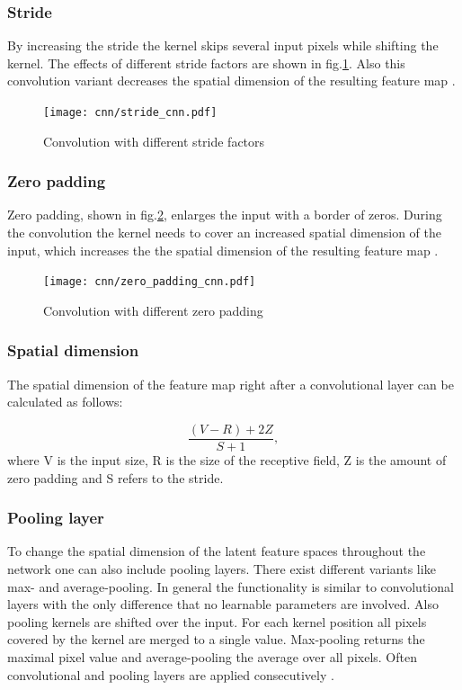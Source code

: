 \subsubsection{Stride}
By increasing the stride the kernel skips several input pixels while shifting the kernel. The effects of different stride factors are shown in fig.\ref{fig:stride_cnn}. Also this convolution variant decreases the spatial dimension of the resulting feature map \cite{OShea2015}.

\begin{figure}[H]
  \centering
  \texttt{[image: cnn/stride\_cnn.pdf]}
  \caption {Convolution with different stride factors}
  \label{fig:stride_cnn}
\end{figure}


\subsubsection{Zero padding}
Zero padding, shown in fig.\ref{fig:zero_padding_cnn}, enlarges the input with a border of zeros. During the convolution the kernel needs to cover an increased spatial dimension of the input, which increases the the spatial dimension of the resulting feature map \cite{OShea2015}.

\begin{figure}[H]
  \centering
  \texttt{[image: cnn/zero\_padding\_cnn.pdf]}
  \caption {Convolution with different zero padding}
  \label{fig:zero_padding_cnn}
\end{figure}



\subsubsection{Spatial dimension}

 The spatial dimension of the feature map right after a convolutional layer can be calculated as follows:

\begin{equation}
  \frac{(V-R)+2Z}{S+1}, 
  \label{eq:spatial_dimensionality_cnn_feature map}
\end{equation}
where V is the input size, R is the size of the receptive field, Z is the amount of zero padding and S refers to the stride.

\subsubsection{Pooling layer}
To change the spatial dimension of the latent feature spaces throughout the network one can also include pooling layers. There exist different variants like max- and average-pooling. In general the functionality is similar to convolutional layers with the only difference that no learnable parameters are involved. Also pooling kernels are shifted over the input. For each kernel position all pixels covered by the kernel are merged to a single value. Max-pooling returns the maximal pixel value and average-pooling the average over all pixels. Often convolutional and pooling layers are applied consecutively \cite{OShea2015}.

